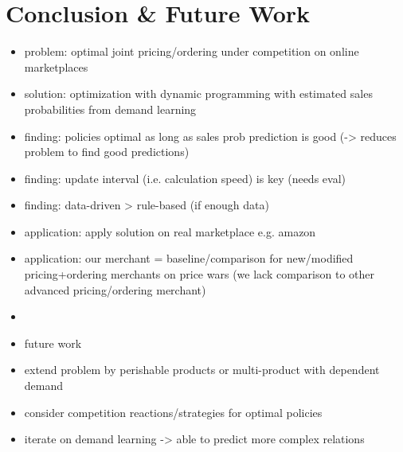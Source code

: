 
\chapter{Conclusion \& Future Work}

\begin{itemize}
	\item problem: optimal joint pricing/ordering under competition on online marketplaces
	\item solution: optimization with dynamic programming with estimated sales probabilities from demand learning
	\item finding: policies optimal as long as sales prob prediction is good (-> reduces problem to find good predictions)
	\item finding: update interval (i.e. calculation speed) is key (needs eval)
	\item finding: data-driven > rule-based (if enough data)
	\item application: apply solution on real marketplace e.g. amazon
	\item application: our merchant = baseline/comparison for new/modified pricing+ordering merchants on price wars (we lack comparison to other advanced pricing/ordering merchant)
	\item
	\item future work
	\item extend problem by perishable products or multi-product with dependent demand
	\item consider competition reactions/strategies for optimal policies
	\item iterate on demand learning -> able to predict more complex relations
\end{itemize}




